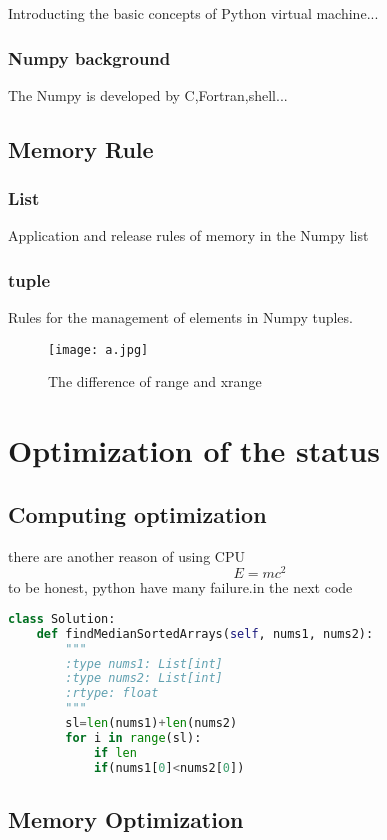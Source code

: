 \documentclass[12pt,a4paper]{article}
\begin{document}
Introducting the basic concepts of Python virtual machine\cite{a1}...
\subsubsection{Numpy background}
The Numpy is developed by C,Fortran,shell... 

\subsection{Memory Rule}

\subsubsection{List}
Application and release rules of memory in the Numpy list\cite{a2}
\subsubsection{tuple}
Rules for the management of elements in Numpy tuples.

\begin{figure}[h]
	\centering
	\texttt{[image: a.jpg]}
	\caption{The difference of range and xrange}
\end{figure}

\section{Optimization of the status}

\subsection{Computing optimization}
there are another reason of using CPU
\begin{equation}
	E=mc^2
\end{equation}
to be honest, python have many failure.in the next code\cite{a1,a2}
\begin{lstlisting}[language=python]
	class Solution:
    def findMedianSortedArrays(self, nums1, nums2):
        """
        :type nums1: List[int]
        :type nums2: List[int]
        :rtype: float
        """
        sl=len(nums1)+len(nums2)
        for i in range(sl):
            if len
            if(nums1[0]<nums2[0])
\end{lstlisting}
\subsection{Memory Optimization}
\end{document}

